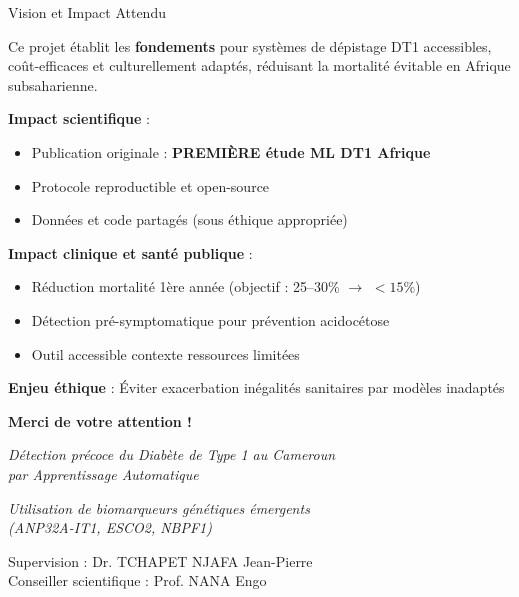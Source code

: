 \documentclass[11pt, aspectratio=169]{beamer}
\begin{document}
\begin{frame}{Vision et Impact Attendu}
  \begin{tcolorbox}[colback=accent2!20, fonttitle=\bfseries, title=Contribution Scientifique Majeure]
    Ce projet établit les \textbf{fondements} pour systèmes de dépistage DT1 accessibles, coût-efficaces et culturellement adaptés, réduisant la mortalité évitable en Afrique subsaharienne.
  \end{tcolorbox}
  
  \vspace{0.8em}
  
  \textbf{\color{accent2} Impact scientifique} :
  \begin{itemize}
    \item Publication originale : \textbf{PREMIÈRE étude ML DT1 Afrique}
    \item Protocole reproductible et open-source
    \item Données et code partagés (sous éthique appropriée)
  \end{itemize}
  
  \vspace{0.6em}
  
  \textbf{\color{accent2} Impact clinique et santé publique} :
  \begin{itemize}
    \item Réduction mortalité 1ère année (objectif : 25--30\% $\rightarrow$ $<15\%$)
    \item Détection pré-symptomatique pour prévention acidocétose
    \item Outil accessible contexte ressources limitées
  \end{itemize}
  
  \vspace{0.6em}
  
  \textbf{\textcolor{accent1}{Enjeu éthique}} : Éviter exacerbation inégalités sanitaires par modèles inadaptés
\end{frame}

\begin{frame}[plain]
  \Huge
  \centering
  \textbf{Merci de votre attention !}
  
  \vspace{2em}
  
  \Large
  \textit{Détection précoce du Diabète de Type 1 au Cameroun \\ par Apprentissage Automatique}
  
  \vspace{1em}
  
  \normalsize
  \textit{Utilisation de biomarqueurs génétiques émergents \\ (ANP32A-IT1, ESCO2, NBPF1)}
  
  \vspace{2em}
  
  \normalsize
  Supervision : Dr. TCHAPET NJAFA Jean-Pierre \\
  Conseiller scientifique : Prof. NANA Engo
\end{frame}
\end{document}
